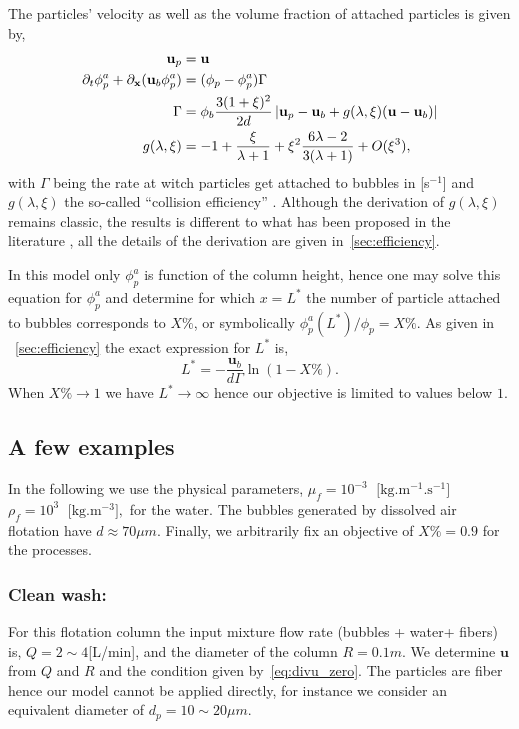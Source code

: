 The particles' velocity as well as the volume fraction of attached particles is given by,
\begin{align}
    \textbf{u}_p &= \textbf{u}\\
    \pddt \phi_p^a  + \pddx (\textbf{u}_b \phi_p^a)
    &= 
    (\phi_p - \phi_p^a) \Gamma
    \label{eq:kinetic_summary}
    \\
    \Gamma &= \phi_b \frac{3(1+\xi)^2 }{2d}
    \left|\textbf{u}_p  - \textbf{u}_b + g(\lambda,\xi) (\textbf{u} - \textbf{u}_b)\right|\\
    g(\lambda,\xi)
    &=
    -1+\frac{\xi}{\lambda + 1} + \xi^2  \frac{6\lambda - 2}{3(\lambda+1)}
    + O(\xi^3),
\end{align}
with $\Gamma$ being the rate at witch particles get attached to bubbles in [s$^{-1}$] and $g(\lambda,\xi)$ the so-called ``collision efficiency'' \citep{loewenberg1994flotation}.
Although the derivation of $g(\lambda,\xi)$ remains classic, the results is different to what has been proposed in the literature \citep{loewenberg1994flotation}, all the details of the derivation are given in~\ref{sec:efficiency}. 

In this model only $\phi_p^a$ is function of the column height, hence one may solve this equation for $\phi_p^a$ and determine for which $x = L^*$ the number of particle attached to bubbles corresponds to $X\%$, or symbolically $\phi_p^a(L^*)/\phi_p = X\%$.
As given in ~\ref{sec:efficiency} the exact expression for $L^*$ is, 
\begin{equation}
    \boxed{
        L^* = 
        - \frac{\textbf{u}_b}{d \Gamma}\ln(1 - X\%).
        }
    \label{eq:L_solution}
\end{equation}
When $X\% \to 1$ we have $L^* \to \infty$ hence our objective is limited to values below $1$. 

\subsection{A few examples}

In the following we use the physical parameters, 
$
    \mu_f = 10^{-3} \;\text{ [kg.m$^{-1}$.s$^{-1}$]}  $  
    $ 
    \rho_f = 10^{3} \;\text{ [kg.m$^{-3}$]},
$
for the water.  
The bubbles generated by dissolved air flotation have $d\approx 70\mu m$. 
Finally, we arbitrarily fix an objective of $X\% = 0.9$ for the processes. 

\subsubsection*{Clean wash:} For this flotation column the input mixture flow rate (bubbles + water+ fibers) is, $Q = 2\sim 4$[L/min], and the diameter of the column $R = 0.1 m$.
We determine $\textbf{u}$ from $Q$ and $R$ and the condition given by~\ref{eq:divu_zero}. 
The particles are fiber hence our model cannot be applied directly, for instance we consider an equivalent diameter of $d_p = 10\sim 20\mu m$. 

